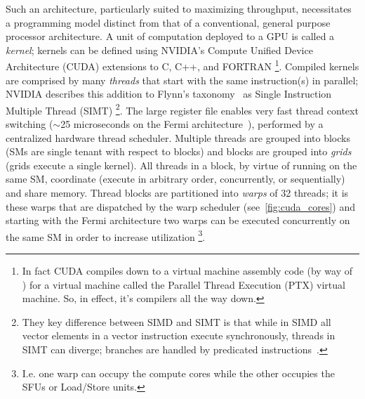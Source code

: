 Such an architecture, particularly suited to maximizing throughput, necessitates a programming model distinct from that of a conventional, general purpose processor architecture.
A unit of computation deployed to a GPU is called a \textit{kernel}; kernels can be defined using NVIDIA's Compute Unified Device Architecture (CUDA) extensions to C, C++, and FORTRAN%
\footnote{In fact CUDA compiles down to a virtual machine assembly code (by way of ) for a virtual machine called the Parallel Thread Execution (PTX) virtual machine. So, in effect, it's compilers all the way down.}.
Compiled kernels are comprised by many \textit{threads} that start with the same instruction(s) in parallel;
NVIDIA describes this addition to Flynn's taxonomy~\cite{5009071} as Single Instruction Multiple Thread (SIMT)%
\footnote{They key difference between SIMD and SIMT is that while in SIMD all vector elements in a vector instruction execute synchronously, threads in SIMT can diverge; branches are handled by predicated instructions~\cite{cuda_toolkit}.}.
The large register file enables very fast thread context switching ($\sim$25 microseconds on the Fermi architecture~\cite{Glaskowsky2009NVIDIAS}), performed by a centralized hardware thread scheduler.
Multiple threads are grouped into blocks (SMs are single tenant with respect to blocks) and blocks are grouped into \textit{grids} (grids execute a single kernel).
All threads in a block, by virtue of running on the same SM, coordinate (execute in arbitrary order, concurrently, or sequentially) and share memory.
Thread blocks are partitioned into \textit{warps} of 32 threads;
it is these warps that are dispatched by the warp scheduler (see~\cref{fig:cuda_cores}) and starting with the Fermi architecture two warps can be executed concurrently on the same SM in order to increase utilization%
\footnote{I.e. one warp can occupy the compute cores while the other occupies the SFUs or Load/Store units.}.



